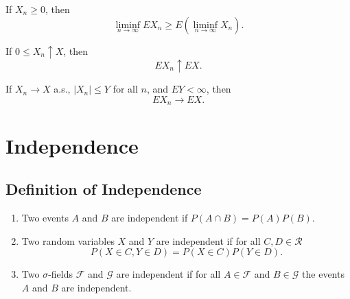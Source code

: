 \begin{definition}[Expectation] \label{def:expectation}

\end{definition}

\begin{theorem} \label{thm:bounded-convergence-theorem}

\end{theorem}

\begin{theorem} \label{thm:fatou-lemma}
    If $X_n \geq 0$, then
    \begin{equation}
        \liminf _{n \rightarrow \infty} E X_{n} \geq E\left(\liminf _{n \rightarrow \infty} X_{n}\right).
    \end{equation}
\end{theorem}


\begin{theorem} \label{thm:monotone-convergence}
    If $0 \leq X_{n} \uparrow X$, then
    \begin{equation}
        E X_{n} \uparrow E X.
    \end{equation}
\end{theorem}

\begin{theorem} \label{thm:dominated-convergence}
    If $X_{n} \rightarrow X$ a.s., $\left|X_{n}\right| \leq Y$ for all $n$, and $E Y<\infty$, then
    \begin{equation}
        E X_{n} \rightarrow E X.
    \end{equation}
\end{theorem}

\section{Independence}

\subsection{Definition of Independence}

\begin{definition}[Independence]
    \begin{enumerate}
        \item Two events $A$ and $B$ are independent if $P(A \cap B)=P(A) P(B)$.
        \item Two random variables $X$ and $Y$ are independent if for all $C,D\in\mathcal{R}$
              \begin{equation}
                  P(X\in C,Y\in D)=P(X\in C)P(Y\in D).
              \end{equation}
        \item Two $\sigma$-fields $\mathcal{F}$ and $\mathcal{G}$ are independent if for all $A\in\mathcal{F}$ and $B\in\mathcal{G}$ the events $A$ and $B$ are independent.
    \end{enumerate}
\end{definition}


